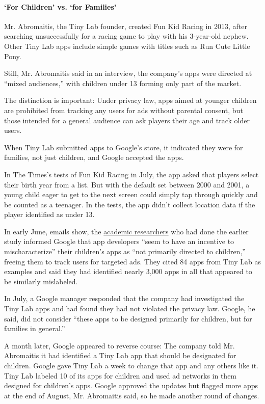 \hypertarget{for-children-vs-for-families}{%
\paragraph{`For Children' vs. `for
Families'}\label{for-children-vs-for-families}}

Mr. Abromaitis, the Tiny Lab founder, created Fun Kid Racing in 2013,
after searching unsuccessfully for a racing game to play with his
3-year-old nephew. Other Tiny Lab apps include simple games with titles
such as Run Cute Little Pony.

Still, Mr. Abromaitis said in an interview, the company's apps were
directed at ``mixed audiences,'' with children under 13 forming only
part of the market.

The distinction is important: Under privacy law, apps aimed at younger
children are prohibited from tracking any users for ads without parental
consent, but those intended for a general audience can ask players their
age and track older users.

When Tiny Lab submitted apps to Google's store, it indicated they were
for families, not just children, and Google accepted the apps.

In The Times's tests of Fun Kid Racing in July, the app asked that
players select their birth year from a list. But with the default set
between 2000 and 2001, a young child eager to get to the next screen
could simply tap through quickly and be counted as a teenager. In the
tests, the app didn't collect location data if the player identified as
under 13.

In early June, emails show, the
\href{https://www.appcensus.mobi/}{academic researchers} who had done
the earlier study informed Google that app developers ``seem to have an
incentive to mischaracterize'' their children's apps as ``not primarily
directed to children,'' freeing them to track users for targeted ads.
They cited 84 apps from Tiny Lab as examples and said they had
identified nearly 3,000 apps in all that appeared to be similarly
mislabeled.

In July, a Google manager responded that the company had investigated
the Tiny Lab apps and had found they had not violated the privacy law.
Google, he said, did not consider ``these apps to be designed primarily
for children, but for families in general.''

A month later, Google appeared to reverse course: The company told Mr.
Abromaitis it had identified a Tiny Lab app that should be designated
for children. Google gave Tiny Lab a week to change that app and any
others like it. Tiny Lab labeled 10 of its apps for children and used ad
networks in them designed for children's apps. Google approved the
updates but flagged more apps at the end of August, Mr. Abromaitis said,
so he made another round of changes.

